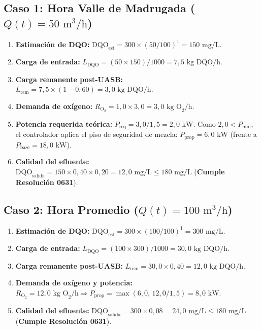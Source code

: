 \documentclass[11pt, a4paper]{article}
\begin{document}
\subsection{Caso 1: Hora Valle de Madrugada ($Q(t) = 50\text{ m}^3/\text{h}$)}
\begin{enumerate}
    \item \textbf{Estimación de DQO:} $\text{DQO}_{\text{est}} = 300 \times (50/100)^1 = 150\text{ mg/L}$.
    \item \textbf{Carga de entrada:} $L_{\text{DQO}} = (50 \times 150)/1000 = 7{,}5\text{ kg DQO/h}$.
    \item \textbf{Carga remanente post-UASB:} $L_{\text{rem}} = 7{,}5 \times (1 - 0{,}60) = 3{,}0\text{ kg DQO/h}$.
    \item \textbf{Demanda de oxígeno:} $R_{\text{O}_2} = 1{,}0 \times 3{,}0 = 3{,}0\text{ kg O}_2/\text{h}$.
    \item \textbf{Potencia requerida teórica:} $P_{\text{req}} = 3{,}0 / 1{,}5 = 2{,}0\text{ kW}$. Como $2{,}0 < P_{\text{min}}$, el controlador aplica el piso de seguridad de mezcla: $P_{\text{prop}} = 6{,}0\text{ kW}$ (frente a $P_{\text{base}} = 18{,}0\text{ kW}$).
    \item \textbf{Calidad del efluente:} $\text{DQO}_{\text{salida}} = 150 \times 0{,}40 \times 0{,}20 = 12{,}0\text{ mg/L} \le 180\text{ mg/L}$ (\textbf{Cumple Resolución 0631}).
\end{enumerate}

\subsection{Caso 2: Hora Promedio ($Q(t) = 100\text{ m}^3/\text{h}$)}
\begin{enumerate}
    \item \textbf{Estimación de DQO:} $\text{DQO}_{\text{est}} = 300 \times (100/100)^1 = 300\text{ mg/L}$.
    \item \textbf{Carga de entrada:} $L_{\text{DQO}} = (100 \times 300)/1000 = 30{,}0\text{ kg DQO/h}$.
    \item \textbf{Carga remanente post-UASB:} $L_{\text{rem}} = 30{,}0 \times 0{,}40 = 12{,}0\text{ kg DQO/h}$.
    \item \textbf{Demanda de oxígeno y potencia:} $R_{\text{O}_2} = 12{,}0\text{ kg O}_2/\text{h} \Rightarrow P_{\text{prop}} = \max(6{,}0, \, 12{,}0/1{,}5) = 8{,}0\text{ kW}$.
    \item \textbf{Calidad del efluente:} $\text{DQO}_{\text{salida}} = 300 \times 0{,}08 = 24{,}0\text{ mg/L} \le 180\text{ mg/L}$ (\textbf{Cumple Resolución 0631}).
\end{enumerate}
\end{document}
